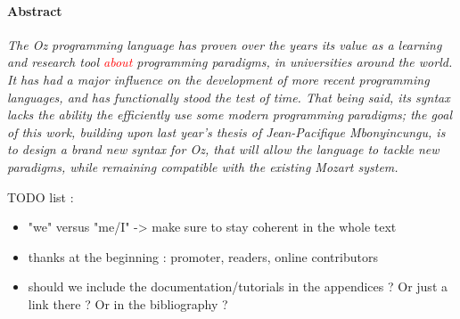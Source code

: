 
\paragraph{Abstract}
\textit{
The \textit{Oz} programming language has proven over the years its value as a learning and research tool \textcolor{red}{about} programming paradigms, in universities around the world.
It has had a major influence on the development of more recent programming languages, and has functionally stood the test of time.
That being said, its syntax lacks the ability the efficiently use some modern programming paradigms;
the goal of this work, building upon last year's thesis of Jean-Pacifique Mbonyincungu, is to design a brand new syntax for \textit{Oz}, that will allow the language to tackle new paradigms, while remaining compatible with the existing Mozart system.
}

TODO list :
\begin{itemize}
    \item "we" versus "me/I" -> make sure to stay coherent in the whole text
    \item thanks at the beginning : promoter, readers, online contributors
    \item should we include the documentation/tutorials in the appendices ? Or just a link there ? Or in the bibliography ?
\end{itemize}